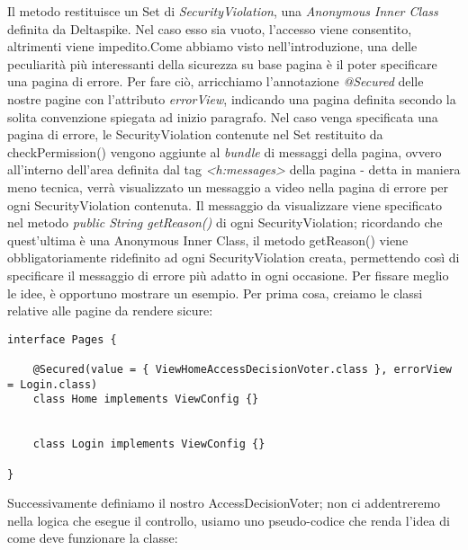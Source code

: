 Il metodo restituisce un Set di \textsl{SecurityViolation}, una \textsl{Anonymous Inner Class} definita da Deltaspike. Nel caso esso sia vuoto, l'accesso viene consentito, altrimenti viene impedito.\newline Come abbiamo visto nell'introduzione, una delle peculiarità più interessanti della sicurezza su base pagina è il poter specificare una pagina di errore. Per fare ciò, arricchiamo l'annotazione \textsl{@Secured} delle nostre pagine con l'attributo \textsl{errorView}, indicando una pagina definita secondo la solita convenzione spiegata ad inizio paragrafo. Nel caso venga specificata una pagina di errore, le SecurityViolation contenute nel Set restituito da checkPermission() vengono aggiunte al \textit{bundle} di messaggi della pagina, ovvero all'interno dell'area definita dal tag \textsl{\textless h:messages\textgreater} della pagina - detta in maniera meno tecnica, verrà visualizzato un messaggio a video nella pagina di errore per ogni SecurityViolation contenuta. \newline Il messaggio da visualizzare viene specificato nel metodo \textsl{public String getReason()} di ogni SecurityViolation; ricordando che quest'ultima è una Anonymous Inner Class, il metodo getReason() viene obbligatoriamente ridefinito ad ogni SecurityViolation creata, permettendo così di specificare il messaggio di errore più adatto in ogni occasione.\newpage
Per fissare meglio le idee, è opportuno mostrare un esempio. Per prima cosa, creiamo le classi relative alle pagine da rendere sicure:

\begin{lstlisting}
interface Pages {

	@Secured(value = { ViewHomeAccessDecisionVoter.class }, errorView = Login.class)
	class Home implements ViewConfig {}

	
	class Login implements ViewConfig {}

}
\end{lstlisting}

Successivamente definiamo il nostro AccessDecisionVoter; non ci addentreremo nella logica che esegue il controllo, usiamo uno pseudo-codice che renda l'idea di come deve funzionare la classe:

